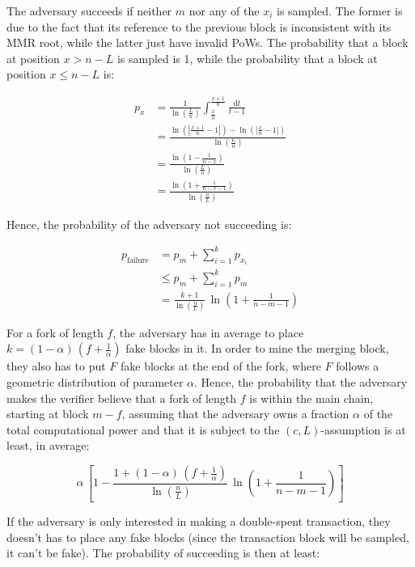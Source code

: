         The adversary succeeds if neither \(m\) nor any of the \(x_i\) is sampled. The former is due to the fact that its reference to the previous block is inconsistent with its MMR root, while the latter just have invalid PoWs. The probability that a block at position \(x>n - L\) is sampled is 1, while the probability that a block at position \(x\leqslant n-L\) is:
        
        \begin{align*}
          p_x &= \frac{1}{\ln\left(\frac{L}{n}\right)}\int_{\frac{x}{n}}^{\frac{x+1}{n}}\frac{\mathrm{d}t}{t-1}\\
          &= \frac{\ln\left(\left|\frac{x+1}{n}-1\right|\right)-\ln\left(\left|\frac{x}{n}-1\right|\right)}{\ln\left(\frac{L}{n}\right)}\\
          &= \frac{\ln\left(1-\frac{1}{n-x}\right)}{\ln\left(\frac{L}{n}\right)}\\
          &= \frac{\ln\left(1+\frac{1}{n-x-1}\right)}{\ln\left(\frac{n}{L}\right)}
        \end{align*}
        
        Hence, the probability of the adversary not succeeding is:
        
        \begin{align*}
          p_{\text{failure}} &= p_m + \sum_{i=1}^kp_{x_i}\\
          &\leqslant p_m + \sum_{i=1}^kp_m\\
          &= \frac{k+1}{\ln\left(\frac{n}{L}\right)}\,\ln\left(1+\frac{1}{n-m-1}\right)
        \end{align*}
        
        For a fork of length \(f\), the adversary has in average to place \(k=(1-\alpha)\,\left(f+\frac{1}{\alpha}\right)\) fake blocks in it. In order to mine the merging block, they also has to put \(F\) fake blocks at the end of the fork, where \(F\) follows a geometric distribution of parameter \(\alpha\). Hence, the probability that the adversary makes the verifier believe that a fork of length \(f\) is within the main chain, starting at block \(m-f\), assuming that the adversary owns a fraction \(\alpha\) of the total computational power and that it is subject to the \((c,L)\)-assumption is at least, in average:
        
        \[\alpha\,\left[1-\frac{1+(1-\alpha)\,\left(f+\frac1\alpha\right)}{\ln\left(\frac{n}{L}\right)}\,\ln\left(1+\frac{1}{n-m-1}\right)\right]\]
        
        If the adversary is only interested in making a double-spent transaction, they doesn't has to place any fake blocks (since the transaction block will be sampled, it can't be fake). The probability of succeeding is then at least:
        

